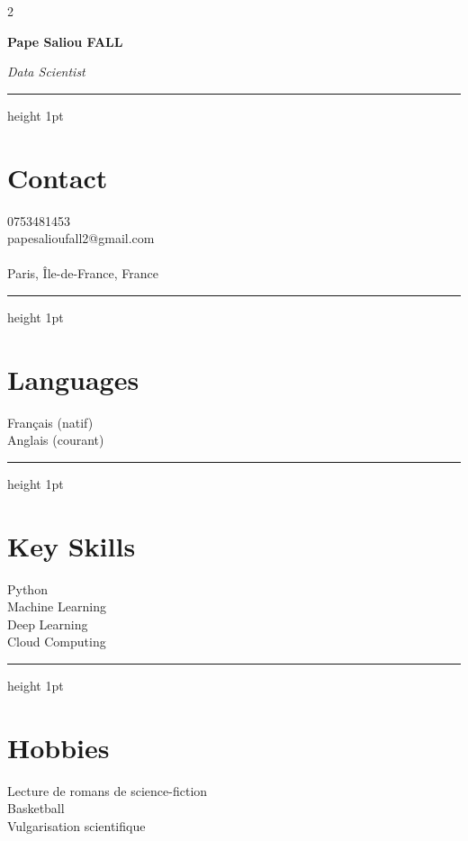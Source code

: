 \documentclass[10pt,letterpaper]{article}
\newcommand{\cvName}[1]{\vspace*{0.3in}\textbf{\LARGE #1}}
\newcommand{\cvHeadline}[1]{\par\smallskip\textit{#1}}
\newcommand{\cvHr}{\vspace{0.5\baselineskip}\hrule height 1pt\color{primary}\vspace{0.7\baselineskip}}
\begin{document}
\small
\begin{paracol}{2}

\begin{leftcolumn}
\begin{center}
\end{center}

\vspace{0.6in}

\cvName{Pape Saliou FALL}
\cvHeadline{Data Scientist}
\cvHr

\section*{Contact}
0753481453\\
papesalioufall2@gmail.com\\
\\ %
Paris, Île-de-France, France\\

\cvHr
\section*{Languages}
Français (natif)\\
Anglais (courant)

\cvHr
\section*{Key Skills}
Python\\
Machine Learning\\
Deep Learning\\
Cloud Computing

\cvHr
\section*{Hobbies}
Lecture de romans de science-fiction\\
Basketball\\
Vulgarisation scientifique
\end{leftcolumn}


\end{paracol}
\end{document}
